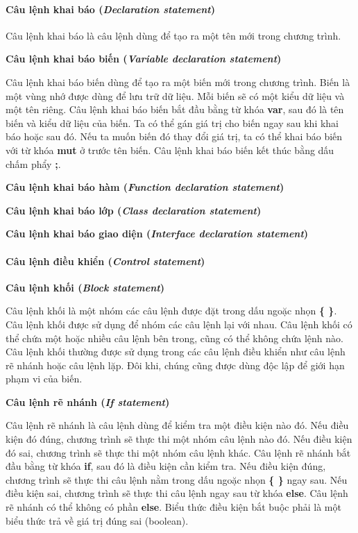 \paragraph{Câu lệnh khai báo (\textit{Declaration statement})}

\regexdeclstmt

Câu lệnh khai báo là câu lệnh dùng để tạo ra một tên mới trong chương trình. 

\noindent\textbf{Câu lệnh khai báo biến (\textit{Variable declaration statement})}

\regexvardeclstmt

Câu lệnh khai báo biến dùng để tạo ra một biến mới trong chương trình. Biến là một vùng nhớ được dùng để lưu trữ dữ liệu. Mỗi biến sẽ có một kiểu dữ liệu và một tên riêng. Câu lệnh khai báo biến bắt đầu bằng từ khóa \textbf{var}, sau đó là tên biến và kiểu dữ liệu của biến. Ta có thể gán giá trị cho biến ngay sau khi khai báo hoặc sau đó. Nếu ta muốn biến đó thay đổi giá trị, ta có thể khai báo biến với từ khóa \textbf{mut} ở trước tên biến. Câu lệnh khai báo biến kết thúc bằng dấu chấm phẩy \textbf{;}.

\noindent\textbf{Câu lệnh khai báo hàm (\textit{Function declaration statement})}

\noindent\textbf{Câu lệnh khai báo lớp (\textit{Class declaration statement})}

\noindent\textbf{Câu lệnh khai báo giao diện (\textit{Interface declaration statement})}

\paragraph{Câu lệnh điều khiển (\textit{Control statement})}

\noindent\textbf{Câu lệnh khối (\textit{Block statement})}

\regexblockstmt

Câu lệnh khối là một nhóm các câu lệnh được đặt trong dấu ngoặc nhọn \textbf{\{ \}}. Câu lệnh khối được sử dụng để nhóm các câu lệnh lại với nhau. Câu lệnh khối có thể chứa một hoặc nhiều câu lệnh bên trong, cũng có thể không chứa lệnh nào. Câu lệnh khối thường được sử dụng trong các câu lệnh điều khiển như câu lệnh rẽ nhánh hoặc câu lệnh lặp. Đôi khi, chúng cũng được dùng độc lập để giới hạn phạm vi của biến.

\noindent\textbf{Câu lệnh rẽ nhánh (\textit{If statement})}

\regexifstmt

Câu lệnh rẽ nhánh là câu lệnh dùng để kiểm tra một điều kiện nào đó. Nếu điều kiện đó đúng, chương trình sẽ thực thi một nhóm câu lệnh nào đó. Nếu điều kiện đó sai, chương trình sẽ thực thi một nhóm câu lệnh khác. Câu lệnh rẽ nhánh bắt đầu bằng từ khóa \textbf{if}, sau đó là điều kiện cần kiểm tra. Nếu điều kiện đúng, chương trình sẽ thực thi câu lệnh nằm trong dấu ngoặc nhọn \textbf{\{ \}} ngay sau. Nếu điều kiện sai, chương trình sẽ thực thi câu lệnh ngay sau từ khóa \textbf{else}. Câu lệnh rẽ nhánh có thể không có phần \textbf{else}. Biểu thức điều kiện bắt buộc phải là một biểu thức trả về giá trị đúng sai (boolean).

